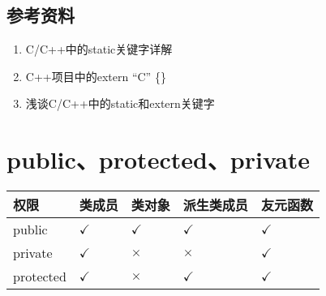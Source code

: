 \documentclass[letterpaper,10pt,english]{sphinxmanual}
\begin{document}
\subsection{参考资料}
\label{\detokenize{cpp/14_staticExtern:id6}}\begin{enumerate}
\item {} 
C/C++中的static关键字详解

\end{enumerate}
\begin{quote}

\end{quote}
\begin{enumerate}
\setcounter{enumi}{1}
\item {} 
C++项目中的extern “C” \{\}

\end{enumerate}
\begin{quote}

\end{quote}
\begin{enumerate}
\setcounter{enumi}{2}
\item {} 
浅谈C/C++中的static和extern关键字

\end{enumerate}
\begin{quote}

\end{quote}


\section{public、protected、private}
\label{\detokenize{cpp/15_classAccess::doc}}\label{\detokenize{cpp/15_classAccess:publicprotectedprivate}}

\begin{savenotes}\sphinxattablestart
\centering
{}
\label{\detokenize{cpp/15_classAccess:id3}}
\sphinxaftercaption
\begin{tabulary}{\linewidth}[t]{|T|T|T|T|T|}
\hline
\sphinxstyletheadfamily 
权限
&\sphinxstyletheadfamily 
类成员
&\sphinxstyletheadfamily 
类对象
&\sphinxstyletheadfamily 
派生类成员
&\sphinxstyletheadfamily 
友元函数
\\
\hline
public
&
\(\checkmark\)
&
\(\checkmark\)
&
\(\checkmark\)
&
\(\checkmark\)
\\
\hline
private
&
\(\checkmark\)
&
\(\times\)
&
\(\times\)
&
\(\checkmark\)
\\
\hline
protected
&
\(\checkmark\)
&
\(\times\)
&
\(\checkmark\)
&
\(\checkmark\)
\\
\hline
\end{tabulary}
\par
\sphinxattableend\end{savenotes}
\end{document}

